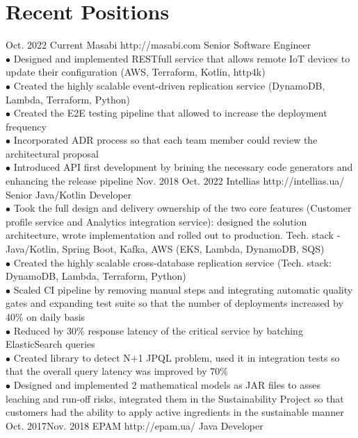 \documentclass[10pt]{article} %
\begin{document}
\section{Recent Positions}
\job
{Oct. 2022 }{ Current}
{Masabi}
{http://masabi.com}
{Senior Software Engineer}
{
\textbf{}   
\\$\bullet$ Designed and implemented RESTfull service that allows remote IoT devices to update their configuration (AWS, Terraform, Kotlin, http4k)
\\$\bullet$ Created the highly scalable event-driven replication service (DynamoDB, Lambda, Terraform, Python)
\\$\bullet$ Created the E2E testing pipeline that allowed to increase the deployment frequency
\\$\bullet$ Incorporated ADR process so that each team member could review the architectural proposal
\\$\bullet$ Introduced API first development by brining the necessary code generators and enhancing the release pipeline
 }
\job
{Nov. 2018 }{ Oct. 2022}
{Intellias}
{http://intellias.ua/}
{Senior Java/Kotlin Developer}
{
\textbf{}   
\\$\bullet$ Took the full design and delivery ownership of the two core features (Customer profile service and Analytics integration service): designed the solution architecture, wrote implementation and rolled out to production. Tech. stack - Java/Kotlin, Spring Boot, Kafka, AWS (EKS, Lambda, DynamoDB, SQS)
\\$\bullet$ Created the highly scalable cross-database replication service (Tech. stack: DynamoDB, Lambda, Terraform, Python)
\\$\bullet$ Scaled CI pipeline by removing manual steps and integrating automatic quality gates and expanding test suite so that the number of deployments increased by 40\% on daily basis 
\\$\bullet$ Reduced by 30\% response latency of the critical service by batching ElasticSearch queries 
\\$\bullet$ Created library to detect N+1 JPQL problem, used it in integration tests so that the overall query latency was improved by 70\% 
\\$\bullet$ Designed and implemented 2 mathematical models as JAR files to asses leaching and run-off risks, 
integrated them in the Sustainability Project so that customers had the ability to apply active ingredients in the sustainable manner
 }
\job
{Oct. 2017}{Nov. 2018}
{EPAM}
{http://epam.ua/}
{Java Developer}
\end{document}
